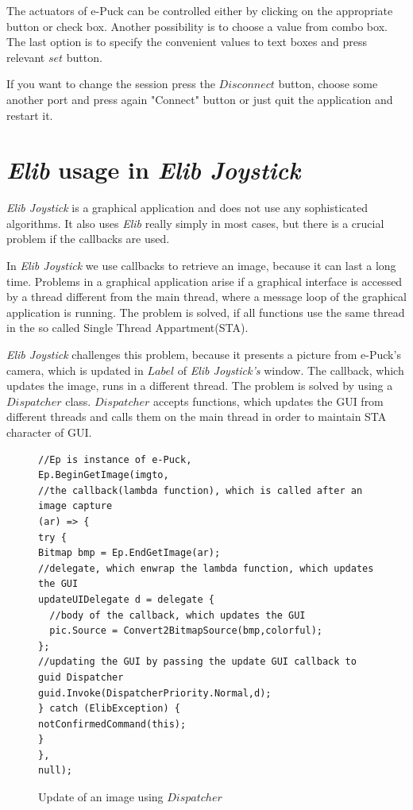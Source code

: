   The actuators of e-Puck can be controlled either by clicking on the appropriate button or check box. 
  Another	possibility is to choose a value from combo box.
  The last option is to specify the  convenient values to text boxes and press relevant $set$ button.

  If you want to change the session press the $Disconnect$ button, choose some another port and 
  press again "Connect" button or	just quit the application and restart it.

  \section{{\it Elib} usage in {\it Elib Joystick}}\label{sec:joystick_trick}
  {\it Elib Joystick} is a graphical application and does not use any sophisticated algorithms. 
  It also uses {\it Elib} really simply in most cases, but there is a crucial problem if the callbacks are used.

  In {\it Elib Joystick} we use callbacks to retrieve an image, because it can last a long time.
  Problems in a graphical application arise if a graphical interface is accessed by a thread different from
  the main thread, where a message loop of the graphical application is running. The problem is solved,
  if all functions use the same thread in the so called Single Thread Appartment(STA).

  {\it Elib Joystick} challenges this problem, because it presents a picture from e-Puck's camera, which is updated
  in $Label$ of {\it Elib Joystick's} window. The callback, which updates the image, runs in a different thread.
  The problem is solved by using a $Dispatcher$ class. $Dispatcher$ accepts functions, which updates
  the GUI from different threads and calls them on the main thread in order to maintain STA character
  of GUI. 

\begin{figure}[!hbp]
\begin{lstlisting}
//Ep is instance of e-Puck,
Ep.BeginGetImage(imgto,
//the callback(lambda function), which is called after an image capture
(ar) => {
try {
Bitmap bmp = Ep.EndGetImage(ar);
//delegate, which enwrap the lambda function, which updates the GUI
updateUIDelegate d = delegate {
  //body of the callback, which updates the GUI
  pic.Source = Convert2BitmapSource(bmp,colorful);
};
//updating the GUI by passing the update GUI callback to guid Dispatcher
guid.Invoke(DispatcherPriority.Normal,d);
} catch (ElibException) {
notConfirmedCommand(this);
}
}, 
null);
\end{lstlisting}
\caption{Update of an image using $Dispatcher$}
\label{updispatcher}
\end{figure}


